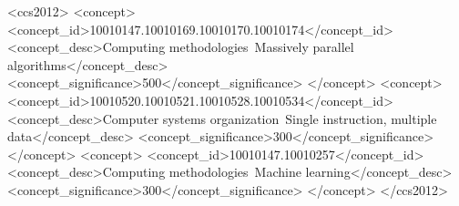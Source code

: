 \documentclass[acmsmall,screen=true,nonacm=true]{acmart}
\begin{document}
\begin{CCSXML}
<ccs2012>
<concept>
<concept_id>10010147.10010169.10010170.10010174</concept_id>
<concept_desc>Computing methodologies~Massively parallel algorithms</concept_desc>
<concept_significance>500</concept_significance>
</concept>
<concept>
<concept_id>10010520.10010521.10010528.10010534</concept_id>
<concept_desc>Computer systems organization~Single instruction, multiple data</concept_desc>
<concept_significance>300</concept_significance>
</concept>
<concept>
<concept_id>10010147.10010257</concept_id>
<concept_desc>Computing methodologies~Machine learning</concept_desc>
<concept_significance>300</concept_significance>
</concept>
</ccs2012>
\end{CCSXML}



\maketitle














\appendix


\end{document}
